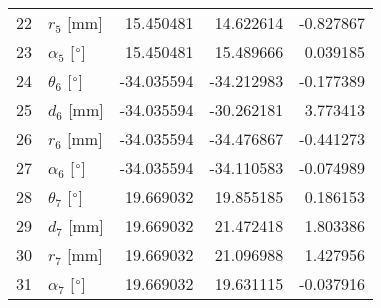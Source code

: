 \documentclass{standalone}%
\begin{document}
\begin{tabular}{llrrr}
22 &              $r_{5}$ [mm] &  15.450481 &  14.622614 &  -0.827867 \\
23 &  $\alpha_{5}$ [$\degree$] &  15.450481 &  15.489666 &   0.039185 \\
24 &  $\theta_{6}$ [$\degree$] & -34.035594 & -34.212983 &  -0.177389 \\
25 &              $d_{6}$ [mm] & -34.035594 & -30.262181 &   3.773413 \\
26 &              $r_{6}$ [mm] & -34.035594 & -34.476867 &  -0.441273 \\
27 &  $\alpha_{6}$ [$\degree$] & -34.035594 & -34.110583 &  -0.074989 \\
28 &  $\theta_{7}$ [$\degree$] &  19.669032 &  19.855185 &   0.186153 \\
29 &              $d_{7}$ [mm] &  19.669032 &  21.472418 &   1.803386 \\
30 &              $r_{7}$ [mm] &  19.669032 &  21.096988 &   1.427956 \\
31 &  $\alpha_{7}$ [$\degree$] &  19.669032 &  19.631115 &  -0.037916 \\
\bottomrule
\end{tabular}
%
\end{document}
